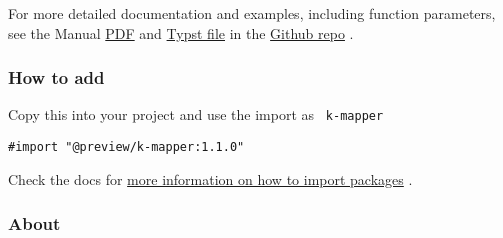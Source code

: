 \begin{Shaded}
\begin{Highlighting}[]
\NormalTok{    ),}
\NormalTok{  )}
\end{Highlighting}
\end{Shaded}


For more detailed documentation and examples, including function
parameters, see the Manual
\href{https://github.com/derekchai/k-mapper/blob/1f334d9e0f02cc656c01835302474bf728db9f80/manual.pdf}{PDF}
and
\href{https://github.com/derekchai/k-mapper/blob/1f334d9e0f02cc656c01835302474bf728db9f80/manual.typ}{Typst
file} in the
\href{https://github.com/derekchai/typst-karnaugh-map}{Github repo} .

\subsubsection{How to add}\label{how-to-add}

Copy this into your project and use the import as \texttt{\ k-mapper\ }

\begin{verbatim}
#import "@preview/k-mapper:1.1.0"
\end{verbatim}



Check the docs for
\href{https://typst.app/docs/reference/scripting/\#packages}{more
information on how to import packages} .

\subsubsection{About}\label{about}

